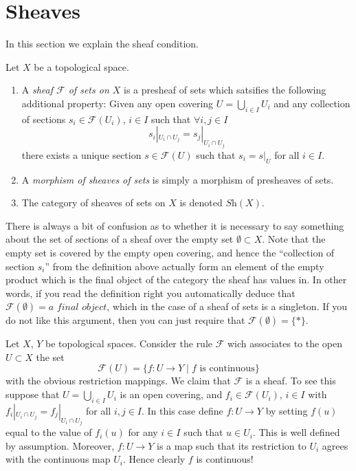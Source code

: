 \section{Sheaves}
\label{section-sheaves}

\noindent
In this section we explain the sheaf condition.

\begin{definition}
\label{definition-sheaf}
Let $X$ be a topological space.
\begin{enumerate}
\item A {\it sheaf $\mathcal{F}$ of sets on $X$} is a presheaf
of sets which satsifies the following additional property: Given
any open covering $U = \bigcup_{i \in I} U_i$ and any collection
of sections $s_i \in \mathcal{F}(U_i)$, $i \in I$ such that
$\forall i,j\in I$
$$
s_i|_{U_i \cap U_j} = s_j|_{U_i \cap U_j}
$$
there exists a unique section $s \in \mathcal{F}(U)$ such that
$s_i = s|_U$ for all $i \in I$.
\item A {\it morphism of sheaves of sets} is simply a
morphism of presheaves of sets.
\item The category of sheaves of sets on $X$ is denoted
$\textit{Sh}(X)$.
\end{enumerate}
\end{definition}

\begin{remark}
There is always a bit of confusion as to whether it is
necessary to say something about the set of sections of
a sheaf over the empty set $\emptyset \subset X$.
Note that the empty set is
covered by the empty open covering, and hence the ``collection
of section $s_i$'' from the definition above actually form
an element of the empty product which is the final object
of the category the sheaf has values in. In other words,
if you read the definition right you automatically deduce
that $\mathcal{F}(\emptyset) = \textit{a final object}$,
which in the case of a sheaf of sets is a singleton.
If you do not like this argument, then you can just require
that $\mathcal{F}(\emptyset) = \{*\}$.
\end{remark}

\begin{example}
\label{example-basic-continuous-maps}
Let $X$, $Y$ be topological spaces.
Consider the rule $\mathcal{F}$ wich associates to
the open $U \subset X$ the set
$$
\mathcal{F}(U) = \{ f : U \to Y \mid f \text{ is continuous}\}
$$
with the obvious restriction mappings. We claim that
$\mathcal{F}$ is a sheaf. To see this suppose that
$U = \bigcup_{i\in I} U_i$ is an open covering, and
$f_i \in \mathcal{F}(U_i)$, $i\in I$ with
$f_i |_{U_i \cap U_j} = f_j|_{U_i \cap U_j}$ for all $i,j \in I$.
In this case define $f : U \to Y$ by setting $f(u)$
equal to the value of $f_i(u)$ for any $i \in I$ such that
$u \in U_i$. This is well defined by assumption. Moreover,
$f : U \to Y$ is a map such that its restriction to $U_i$
agrees with the continuous map $U_i$. Hence clearly $f$ is
continuous!
\end{example}

